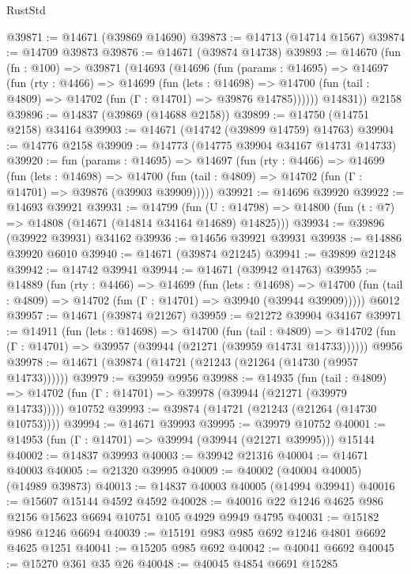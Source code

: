 \begin{lexlean}{RustStd}
\begin{coremodule}
@39871 := @14671 (@39869 @14690)
@39873 := @14713 (@14714 @1567)
@39874 := @14709 @39873
@39876 := @14671 (@39874 @14738)
@39893 := @14670
    (fun (fn : @100) =>
    @39871
      (@14693
        (@14696
          (fun (params : @14695) =>
          @14697
            (fun (rty : @4466) =>
            @14699
              (fun (lets : @14698) =>
              @14700 (fun (tail : @4809) => @14702 (fun (Γ : @14701) => @39876 @14785))))))
        @14831))
    @2158
@39896 := @14837 (@39869 (@14688 @2158))
@39899 := @14750 (@14751 @2158) @34164
@39903 := @14671 (@14742 (@39899 @14759) @14763)
@39904 := @14776 @2158
@39909 := @14773 (@14775 @39904 @34167 @14731 @14733)
@39920 := fun (params : @14695) =>
  @14697
    (fun (rty : @4466) =>
    @14699
      (fun (lets : @14698) =>
      @14700 (fun (tail : @4809) => @14702 (fun (Γ : @14701) => @39876 (@39903 @39909)))))
@39921 := @14696 @39920
@39922 := @14693 @39921
@39931 := @14799
    (fun (U : @14798) => @14800 (fun (t : @7) => @14808 (@14671 (@14814 @34164 @14689) @14825)))
@39934 := @39896 (@39922 @39931) @34162
@39936 := @14656 @39921 @39931
@39938 := @14886 @39920 @6010
@39940 := @14671 (@39874 @21245)
@39941 := @39899 @21248
@39942 := @14742 @39941
@39944 := @14671 (@39942 @14763)
@39955 := @14889
    (fun (rty : @4466) =>
    @14699
      (fun (lets : @14698) =>
      @14700 (fun (tail : @4809) => @14702 (fun (Γ : @14701) => @39940 (@39944 @39909)))))
    @6012
@39957 := @14671 (@39874 @21267)
@39959 := @21272 @39904 @34167
@39971 := @14911
    (fun (lets : @14698) =>
    @14700
      (fun (tail : @4809) =>
      @14702 (fun (Γ : @14701) => @39957 (@39944 (@21271 (@39959 @14731 @14733))))))
    @9956
@39978 := @14671 (@39874 (@14721 (@21243 (@21264 (@14730 (@9957 @14733))))))
@39979 := @39959 @9956
@39988 := @14935
    (fun (tail : @4809) => @14702 (fun (Γ : @14701) => @39978 (@39944 (@21271 (@39979 @14733)))))
    @10752
@39993 := @39874 (@14721 (@21243 (@21264 (@14730 @10753))))
@39994 := @14671 @39993
@39995 := @39979 @10752
@40001 := @14953 (fun (Γ : @14701) => @39994 (@39944 (@21271 @39995))) @15144
@40002 := @14837 @39993
@40003 := @39942 @21316
@40004 := @14671 @40003
@40005 := @21320 @39995
@40009 := @40002 (@40004 @40005) (@14989 @39873)
@40013 := @14837 @40003 @40005 (@14994 @39941)
@40016 := @15607 @15144 @4592 @4592
@40028 := @40016 @22 @1246 @4625 @986 @2156 @15623 @6694 @10751 @105 @4929 @9949 @4795
@40031 := @15182 @986 @1246 @6694
@40039 := @15191 @983 @985 @692 @1246 @4801 @6692 @4625 @1251
@40041 := @15205 @985 @692
@40042 := @40041 @6692
@40045 := @15270 @361 @35 @26
@40048 := @40045 @4854 @6691 @15285

\end{coremodule}
\end{lexlean}

